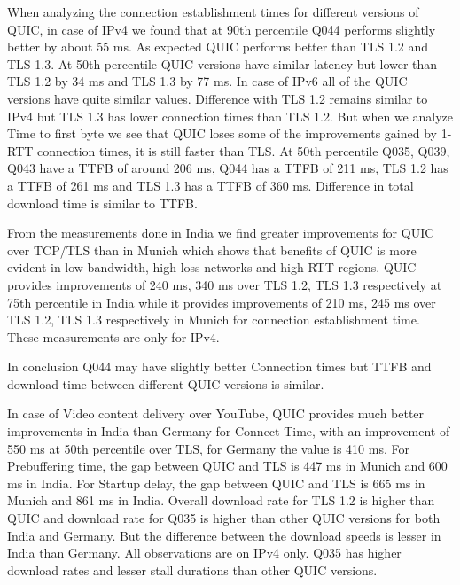\begin{frame}

\end{frame}
\clearpage

\begin{frame}[allowframebreaks]

When analyzing the connection establishment times for different versions of QUIC, in case of IPv4 we found that at 90th percentile Q044 performs slightly better by about 55 ms. As expected QUIC performs better than TLS 1.2 and TLS 1.3. At 50th percentile QUIC versions have similar latency but lower than TLS 1.2 by 34 ms and TLS 1.3 by 77 ms.
In case of IPv6 all of the QUIC versions have quite similar values. Difference with TLS 1.2 remains similar to IPv4 but TLS 1.3 has lower connection times than TLS 1.2. But when we analyze Time to first byte we see that QUIC loses some of the improvements gained by 1-RTT connection times, it is still faster than TLS. At 50th percentile Q035, Q039, Q043 have a TTFB of around 206 ms, Q044 has a TTFB of 211 ms, TLS 1.2 has a TTFB of 261 ms and TLS 1.3 has a TTFB of 360 ms. Difference in total download time is similar to TTFB.

From the measurements done in India we find greater improvements for QUIC over TCP/TLS than in Munich which shows that benefits of QUIC is more evident in low-bandwidth, high-loss networks and high-RTT regions. QUIC provides improvements of 240 ms, 340 ms over TLS 1.2, TLS 1.3 respectively at 75th percentile in India while it provides improvements of 210 ms, 245 ms over TLS 1.2, TLS 1.3 respectively in Munich for connection establishment time. These measurements are only for IPv4.

In conclusion Q044 may have slightly better Connection times but TTFB and download time between different QUIC versions is similar.

In case of Video content delivery over YouTube, QUIC provides much better improvements in India than Germany for Connect Time, with an improvement of 550 ms at 50th percentile  over TLS, for Germany the value is 410 ms. For Prebuffering time, the gap between QUIC and TLS is 447 ms in Munich and 600 ms in India. 
For Startup delay, the gap between QUIC and TLS is 665 ms in Munich and 861 ms in India.
Overall download rate for TLS 1.2 is higher than QUIC and download rate for Q035 is higher than other QUIC versions for both India and Germany. But the difference between the download speeds is lesser in India than Germany. All observations are on IPv4 only. Q035 has higher download rates and lesser stall durations than other QUIC versions.


\end{frame}
